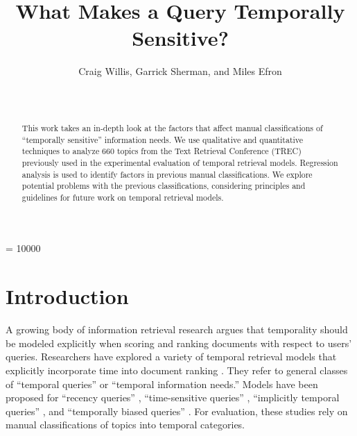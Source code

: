 \documentclass{sig-alternate-05-2015}
\begin{document}

\author{
Craig Willis, Garrick Sherman, and Miles Efron\\
     \\
       \\
}


\widowpenalty = 10000

\title{What Makes a Query Temporally Sensitive?}

\maketitle

\begin{abstract}
This work takes an in-depth look at the factors that affect manual classifications of ``temporally sensitive'' information needs. We use qualitative and quantitative techniques to analyze 660 topics from the Text Retrieval Conference (TREC) previously used in the experimental evaluation of temporal retrieval models.  Regression analysis is used to identify factors in previous manual classifications. We explore potential problems with the previous classifications, considering principles and guidelines for future work on temporal retrieval models.
\end{abstract}

\section{Introduction}

A growing body of information retrieval research argues that temporality should be modeled explicitly when scoring and ranking documents with respect to users' queries. Researchers have explored a variety of temporal retrieval models that explicitly incorporate time into document ranking \cite{Li2003,Efron2011,Dakka2012}. They refer to general classes of ``temporal queries'' or ``temporal information needs.''  Models have been proposed for ``recency queries'' \cite{Li2003,Efron2011}, ``time-sensitive queries'' \cite{Dakka2012}, ``implicitly temporal queries'' \cite{Metzler2009}, and ``temporally biased queries'' \cite{Jones2007}.  For evaluation,  these studies rely on manual classifications of topics into temporal categories.
\end{document}
